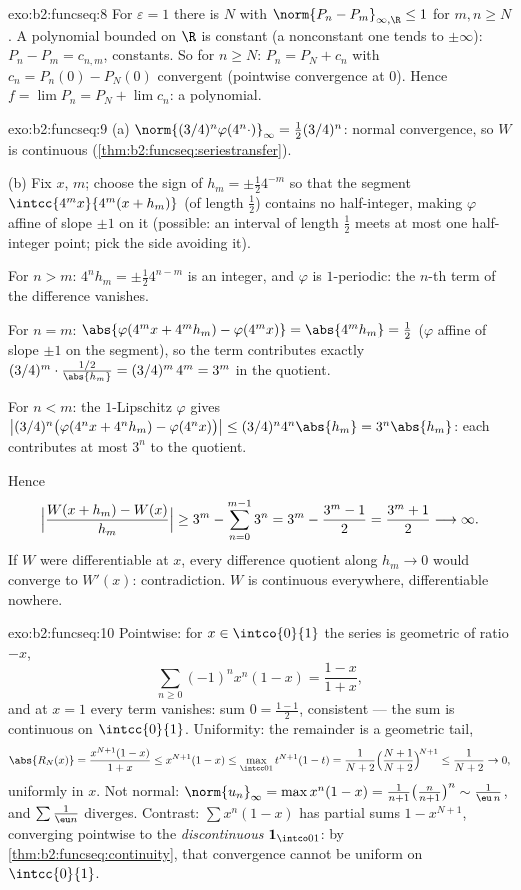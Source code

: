 \begin{solution}{exo:b2:funcseq:8}
For $\varepsilon = 1$ there is $N$ with $\norm{P_n - P_m}_{\infty,
\R} \leq 1$ for $m, n \geq N$. A polynomial bounded on $\R$ is
constant (a nonconstant one tends to $\pm\infty$): $P_n - P_m =
c_{n,m}$, constants. So for $n \geq N$: $P_n = P_N + c_n$ with
$c_n = P_n(0) - P_N(0)$ convergent (pointwise convergence at $0$).
Hence $f = \lim P_n = P_N + \lim c_n$: a polynomial.
\end{solution}

\begin{solution}{exo:b2:funcseq:9}
(a) $\norm{(3/4)^n\varphi(4^n\cdot)}_\infty = \frac12
(3/4)^n$: normal convergence, so $W$ is continuous
(\cref{thm:b2:funcseq:seriestransfer}).

(b) Fix $x$, $m$; choose the sign of $h_m = \pm\frac12 4^{-m}$ so
that the segment $\intcc{4^mx}{4^m(x + h_m)}$ (of length $\frac12$)
contains no half-integer, making $\varphi$ affine of slope $\pm1$
on it (possible: an interval of length $\frac12$ meets at most one
half-integer point; pick the side avoiding it).

For $n > m$: $4^n h_m = \pm\frac12 4^{n-m}$ is an integer, and
$\varphi$ is $1$-periodic: the $n$-th term of the difference
vanishes.

For $n = m$: $\abs{\varphi(4^m x + 4^m h_m) - \varphi(4^m x)} =
\abs{4^m h_m} = \frac12$ ($\varphi$ affine of slope $\pm 1$ on the
segment), so the term contributes exactly $(3/4)^m \cdot
\frac{1/2}{\abs{h_m}} = (3/4)^m\,4^m = 3^m$ in the quotient.

For $n < m$: the $1$-Lipschitz $\varphi$ gives
$\bigl|(3/4)^n\bigl(\varphi(4^nx + 4^nh_m) -
\varphi(4^nx)\bigr)\bigr| \leq (3/4)^n 4^n\abs{h_m} =
3^n\abs{h_m}$: each contributes at most $3^n$ to the quotient.

Hence
\[
\Bigl|\frac{W(x + h_m) - W(x)}{h_m}\Bigr|
\geq 3^m - \sum_{n=0}^{m-1} 3^n
= 3^m - \frac{3^m - 1}{2} = \frac{3^m + 1}{2}
\longrightarrow \infty .
\]
If $W$ were differentiable at $x$, every difference quotient along
$h_m \to 0$ would converge to $W'(x)$: contradiction. $W$ is
continuous everywhere, differentiable nowhere.
\end{solution}

\begin{solution}{exo:b2:funcseq:10}
Pointwise: for $x \in \intco{0}{1}$ the series is geometric of
ratio $-x$,
\[
\sum_{n\geq0}(-1)^n x^n(1-x) = \frac{1-x}{1+x},
\]
and at $x = 1$ every term vanishes: sum $0 = \frac{1-1}{2}$,
consistent --- the sum is continuous on $\intcc{0}{1}$.
Uniformity: the remainder is a geometric tail,
\[
\abs{R_N(x)} = \frac{x^{N+1}(1-x)}{1+x} \leq x^{N+1}(1 - x)
\leq \max_{\intcc01} t^{N+1}(1-t)
= \frac{1}{N+2}\Bigl(\frac{N+1}{N+2}\Bigr)^{\!N+1}
\leq \frac{1}{N+2} \to 0 ,
\]
uniformly in $x$. Not normal: $\norm{u_n}_\infty =
\max x^n(1-x) = \frac{1}{n+1}\bigl(\frac{n}{n+1}\bigr)^n \sim
\frac{1}{\eu\,n}$, and $\sum \frac1{\eu n}$ diverges. Contrast:
$\sum x^n(1-x)$ has partial sums $1 - x^{N+1}$, converging
pointwise to the \emph{discontinuous} $\mathbf 1_{\intco01}$: by
\cref{thm:b2:funcseq:continuity}, that convergence cannot be
uniform on $\intcc{0}{1}$.
\end{solution}

